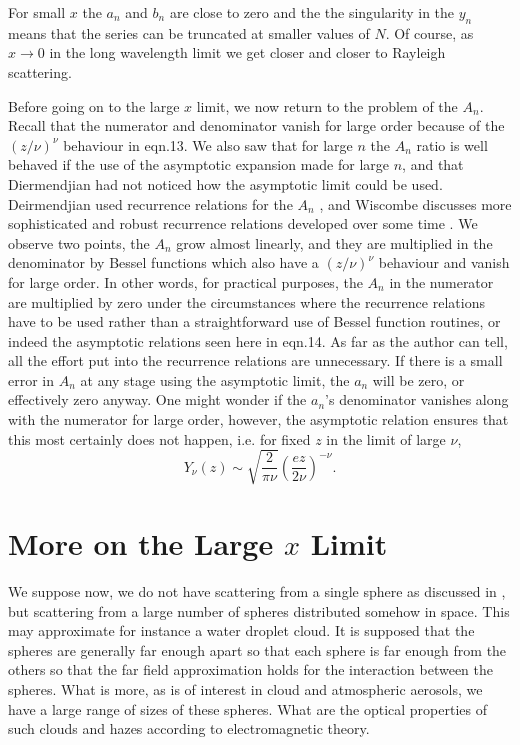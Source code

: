 \documentclass[12pt]{article}
\begin{document}
For small $x$ the $a_n$ and $b_n$ are close to zero and the the singularity in the $y_n$
means that the series can be truncated at smaller values of $N$. Of course, as $x\rightarrow 0$
in the long wavelength limit we get closer and closer to Rayleigh scattering.

Before going on to the large $x$ limit, we now return to the problem of the $A_n$. Recall that
the numerator and denominator vanish for large order because of the $(z/\nu)^\nu$ behaviour
in eqn.13. We also saw that for large $n$ the $A_n$ ratio is well behaved if the use of
the asymptotic expansion made for large $n$, and that Diermendjian had not noticed how the asymptotic
limit could be used. Deirmendjian used recurrence relations for the 
 $A_n$ \cite{Deirmendjian:Miebib}, 
and Wiscombe discusses more
sophisticated and robust recurrence relations developed over some time \cite{WisRep:Miebib}.
We observe two points, the $A_n$ grow almost linearly, and they are multiplied in the
denominator by Bessel functions which also have a $(z/\nu)^\nu$ behaviour and vanish for
large order. In other words, for practical purposes, the $A_n$ in the numerator are multiplied by zero
under the circumstances where the recurrence relations have to be used rather than
a straightforward use of Bessel function routines, or indeed the asymptotic relations
seen  here in eqn.14. As far as the author can tell, all the effort put into the recurrence
relations are unnecessary. If there is a small error in $A_n$ at any stage using the asymptotic limit,  
the $a_n$ will be zero, or effectively zero anyway. One might wonder if the $a_n$'s denominator vanishes
along with the numerator for large order, however, the asymptotic 
relation \cite{AbramowitzStegun:Miebib}
ensures that this most certainly does not happen, i.e. for fixed $z$ in the limit of large $\nu$, 
\begin{equation}
Y_\nu(z) \sim \sqrt{ \frac{2} {\pi \nu} } \left ( \frac{e z}{2 \nu} \right )^{-\nu}.
\end{equation}

\section{More on the Large $x$ Limit}

We suppose now, we do not have scattering from a single sphere as discussed
in \cite{EMScatt:Miebib}, but scattering from a large number of spheres distributed somehow in space. This may approximate for instance a water droplet cloud. It is supposed that the spheres are generally far enough apart so that each sphere is far enough from the others so that the far field approximation holds for the interaction between the spheres. What is more, as is of interest in cloud and atmospheric aerosols, we have a large range of sizes of these spheres. What are the optical properties of such clouds and hazes according to electromagnetic theory.
\end{document}
